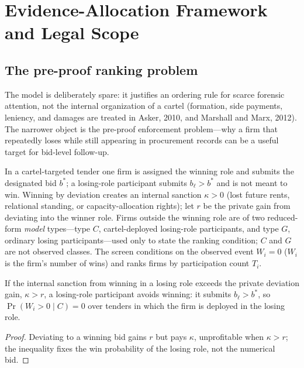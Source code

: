 \section{Evidence-Allocation Framework and Legal Scope}
\label{app:framework_submission}

\subsection{The pre-proof ranking problem}
\label{app:framework_primitives}

The model is deliberately spare: it justifies an ordering rule for
scarce forensic attention, not the internal organization of a cartel
(formation, side payments, leniency, and damages are treated in Asker,
2010, and Marshall and Marx, 2012). The narrower object is the pre-proof
enforcement problem---why a firm that repeatedly loses while still
appearing in procurement records can be a useful target for bid-level
follow-up.

In a cartel-targeted tender one firm is assigned the winning role and
submits the designated bid $b^*$; a losing-role participant submits
$b_\ell>b^*$ and is not meant to win. Winning by deviation creates an
internal sanction $\kappa>0$ (lost future rents, relational standing, or
capacity-allocation rights); let $r$ be the private gain from deviating
into the winner role. Firms outside the winning role are of two
reduced-form \emph{model} types---type $C$, cartel-deployed losing-role
participants, and type $G$, ordinary losing participants---used only to
state the ranking condition; $C$ and $G$ are not observed classes. The
screen conditions on the observed event $W_i=0$ ($W_i$ is the firm's
number of wins) and ranks firms by participation count $T_i$.

\begin{lemma}
\label{lem:submission_zero_win}
If the internal sanction from winning in a losing role exceeds the
private deviation gain, $\kappa>r$, a losing-role participant avoids
winning: it submits $b_\ell>b^*$, so $\Pr(W_i>0\mid C)=0$ over tenders
in which the firm is deployed in the losing role.
\end{lemma}

\begin{proof}
Deviating to a winning bid gains $r$ but pays $\kappa$, unprofitable when
$\kappa>r$; the inequality fixes the win probability of the losing role,
not the numerical bid.
\end{proof}

